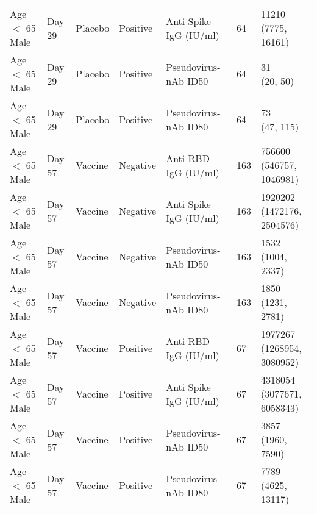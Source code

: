 \documentclass[]{book}
\theoremstyle{definition}
\theoremstyle{definition}
\theoremstyle{definition}
\newcommand{\1}{\mathbbm{1}}
\begin{document}
\begin{landscape}
\begin{ThreePartTable}
\begin{longtable}[t]{>{\raggedright\arraybackslash}p{7cm}llllll}
\hspace{1em}Age $<$ 65 Male & Day 29 & Placebo & Positive & Anti Spike IgG (IU/ml) & 64 & \makecell[l]{11210\\(7775, 16161)}\\
\hspace{1em}Age $<$ 65 Male & Day 29 & Placebo & Positive & Pseudovirus-nAb ID50 & 64 & \makecell[l]{31\\(20, 50)}\\
\hspace{1em}Age $<$ 65 Male & Day 29 & Placebo & Positive & Pseudovirus-nAb ID80 & 64 & \makecell[l]{73\\(47, 115)}\\
\hspace{1em}Age $<$ 65 Male & Day 57 & Vaccine & Negative & Anti RBD IgG (IU/ml) & 163 & \makecell[l]{756600\\(546757, 1046981)}\\
\hspace{1em}Age $<$ 65 Male & Day 57 & Vaccine & Negative & Anti Spike IgG (IU/ml) & 163 & \makecell[l]{1920202\\(1472176, 2504576)}\\
\hspace{1em}Age $<$ 65 Male & Day 57 & Vaccine & Negative & Pseudovirus-nAb ID50 & 163 & \makecell[l]{1532\\(1004, 2337)}\\
\hspace{1em}Age $<$ 65 Male & Day 57 & Vaccine & Negative & Pseudovirus-nAb ID80 & 163 & \makecell[l]{1850\\(1231, 2781)}\\
\hspace{1em}Age $<$ 65 Male & Day 57 & Vaccine & Positive & Anti RBD IgG (IU/ml) & 67 & \makecell[l]{1977267\\(1268954, 3080952)}\\
\hspace{1em}Age $<$ 65 Male & Day 57 & Vaccine & Positive & Anti Spike IgG (IU/ml) & 67 & \makecell[l]{4318054\\(3077671, 6058343)}\\
\hspace{1em}Age $<$ 65 Male & Day 57 & Vaccine & Positive & Pseudovirus-nAb ID50 & 67 & \makecell[l]{3857\\(1960, 7590)}\\
\hspace{1em}Age $<$ 65 Male & Day 57 & Vaccine & Positive & Pseudovirus-nAb ID80 & 67 & \makecell[l]{7789\\(4625, 13117)}\\

\end{longtable}
\end{ThreePartTable}
\end{landscape}
\end{document}
